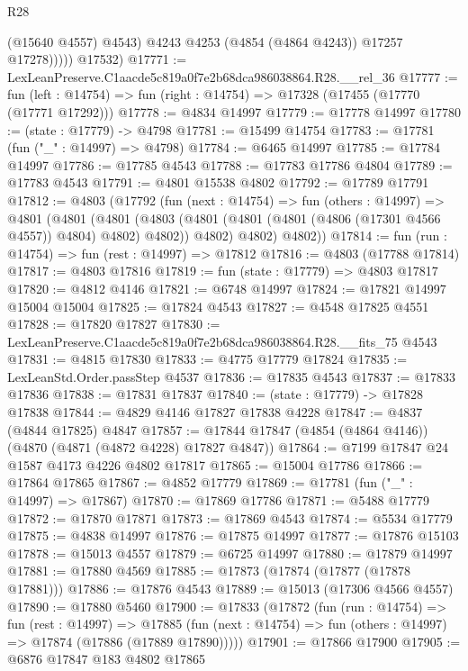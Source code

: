 \begin{lexlean}{R28}
\begin{coremodule}
                  (@15640 @4557)
                  @4543)
                @4243
                @4253
                (@4854 (@4864 @4243))
                @17257
                @17278)))))
      @17532)
@17771 := LexLeanPreserve.C1aacde5c819a0f7e2b68dca986038864.R28.__rel_36
@17777 := fun (left : @14754) => fun (right : @14754) => @17328 (@17455 (@17770 (@17771 @17292)))
@17778 := @4834 @14997
@17779 := @17778 @14997
@17780 := (state : @17779) -> @4798
@17781 := @15499 @14754
@17783 := @17781 (fun ("_" : @14997) => @4798)
@17784 := @6465 @14997
@17785 := @17784 @14997
@17786 := @17785 @4543
@17788 := @17783 @17786 @4804
@17789 := @17783 @4543
@17791 := @4801 @15538 @4802
@17792 := @17789 @17791
@17812 := @4803
    (@17792
      (fun (next : @14754) =>
      fun (others : @14997) =>
      @4801
        (@4801
          (@4801
            (@4803 (@4801 (@4801 (@4801 (@4806 (@17301 @4566 @4557)) @4804) @4802) @4802))
            @4802)
          @4802)
        @4802))
@17814 := fun (run : @14754) => fun (rest : @14997) => @17812
@17816 := @4803 (@17788 @17814)
@17817 := @4803 @17816
@17819 := fun (state : @17779) => @4803 @17817
@17820 := @4812 @4146
@17821 := @6748 @14997
@17824 := @17821 @14997 @15004 @15004
@17825 := @17824 @4543
@17827 := @4548 @17825 @4551
@17828 := @17820 @17827
@17830 := LexLeanPreserve.C1aacde5c819a0f7e2b68dca986038864.R28.__fits_75 @4543
@17831 := @4815 @17830
@17833 := @4775 @17779 @17824
@17835 := LexLeanStd.Order.passStep @4537
@17836 := @17835 @4543
@17837 := @17833 @17836
@17838 := @17831 @17837
@17840 := (state : @17779) -> @17828 @17838
@17844 := @4829 @4146 @17827 @17838 @4228
@17847 := @4837 (@4844 @17825) @4847
@17857 := @17844 @17847 (@4854 (@4864 @4146)) (@4870 (@4871 (@4872 @4228) @17827 @4847))
@17864 := @7199 @17847 @24 @1587 @4173 @4226 @4802 @17817
@17865 := @15004 @17786
@17866 := @17864 @17865
@17867 := @4852 @17779
@17869 := @17781 (fun ("_" : @14997) => @17867)
@17870 := @17869 @17786
@17871 := @5488 @17779
@17872 := @17870 @17871
@17873 := @17869 @4543
@17874 := @5534 @17779
@17875 := @4838 @14997
@17876 := @17875 @14997
@17877 := @17876 @15103
@17878 := @15013 @4557
@17879 := @6725 @14997
@17880 := @17879 @14997
@17881 := @17880 @4569
@17885 := @17873 (@17874 (@17877 (@17878 @17881)))
@17886 := @17876 @4543
@17889 := @15013 (@17306 @4566 @4557)
@17890 := @17880 @5460
@17900 := @17833
    (@17872
      (fun (run : @14754) =>
      fun (rest : @14997) =>
      @17885 (fun (next : @14754) => fun (others : @14997) => @17874 (@17886 (@17889 @17890)))))
@17901 := @17866 @17900
@17905 := @6876 @17847 @183 @4802 @17865

\end{coremodule}
\end{lexlean}
